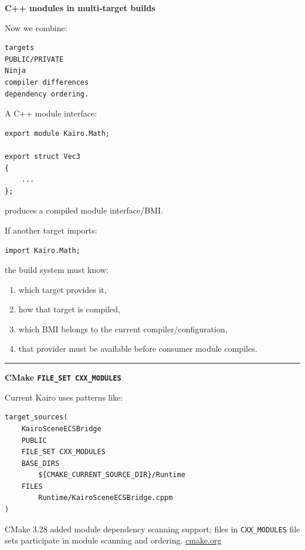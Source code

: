 \textbf{C++ modules in multi-target builds}

Now we combine:

\begin{verbatim}
targets
PUBLIC/PRIVATE
Ninja
compiler differences
dependency ordering.
\end{verbatim}

A C++ module interface:

\begin{verbatim}
export module Kairo.Math;

export struct Vec3
{
    ...
};
\end{verbatim}

produces a compiled module interface/BMI.

If another target imports:

\begin{verbatim}
import Kairo.Math;
\end{verbatim}

the build system must know:

\begin{enumerate}
\def\labelenumi{\arabic{enumi}.}
\tightlist
\item
  which target provides it,
\item
  how that target is compiled,
\item
  which BMI belongs to the current compiler/configuration,
\item
  that provider must be available before consumer module compiles.
\end{enumerate}

\begin{center}\rule{0.5\linewidth}{0.5pt}\end{center}

\textbf{CMake \texttt{FILE\_SET\ CXX\_MODULES}}

Current Kairo uses patterns like:

\begin{verbatim}
target_sources(
    KairoSceneECSBridge
    PUBLIC
    FILE_SET CXX_MODULES
    BASE_DIRS
        ${CMAKE_CURRENT_SOURCE_DIR}/Runtime
    FILES
        Runtime/KairoSceneECSBridge.cppm
)
\end{verbatim}

CMake 3.28 added module dependency scanning support; files in \texttt{CXX\_MODULES} file sets participate in module scanning and ordering. \href{https://cmake.org/cmake/help/git-stage/manual/cmake-cxxmodules.7.html?utm_source=chatgpt.com}{cmake.org}

